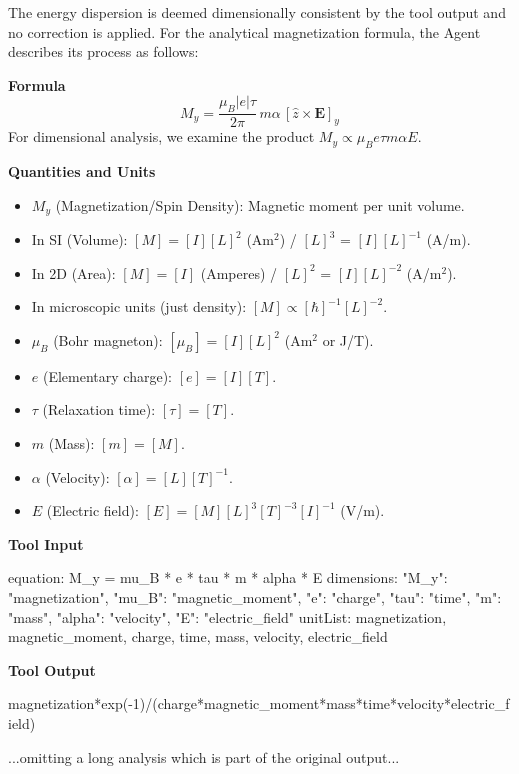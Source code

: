 \documentclass[
	fontsize = 11pt,
	paper = a4,
	draft = false,
	twoside = true,
	titlepage = false
]{scrartcl}
\numberwithin{equation}{subsection}
\begin{document}
	The energy dispersion is deemed dimensionally consistent by the tool output and no correction is applied. For the analytical magnetization formula, the \gls{Agent} describes its process as follows:
	\begin{tcolorbox}[enhanced, breakable, title=Unit Correction for the HDR Magnetization as Stated in the Output, colback=blue!5!white, colframe=blue!75!black] \label{pma:unitHDR}
		\textbf{\large Formula}
		$$
		M_y = \frac{\mu_B |e|\tau}{2\pi}\,m\alpha\,[\hat{z}\times\mathbf{E}]_y
		$$
		For dimensional analysis, we examine the product $M_y \propto \mu_B e \tau m \alpha E$.
		
		\textbf{\large Quantities and Units}
		\begin{itemize}
			\item[-] $M_y$ (Magnetization/Spin Density): Magnetic moment per unit volume.
			\item[-] In SI (Volume): $[M] = [I][L]^2$ (Am$^2$) / $[L]^3$ = $[I][L]^{-1}$ (A/m).
			\item[-] In 2D (Area): $[M] = [I]$ (Amperes) / $[L]^2$ = $[I][L]^{-2}$ (A/m$^2$).
			\item[-] In microscopic units (just density): $[M] \propto [\hbar]^{-1}[L]^{-2}$.
			\item[-] $\mu_B$ (Bohr magneton): $[\mu_B] = [I][L]^2$ (Am$^2$ or J/T).
			\item[-] $e$ (Elementary charge): $[e] = [I][T]$.
			\item[-] $\tau$ (Relaxation time): $[\tau] = [T]$.
			\item[-] $m$ (Mass): $[m] = [M]$.
			\item[-] $\alpha$ (Velocity): $[\alpha] = [L][T]^{-1}$.
			\item[-] $E$ (Electric field): $[E] = [M][L]^3[T]^{-3}[I]^{-1}$ (V/m).
		\end{itemize}
		
		\textbf{\large Tool Input}
		\begin{tcolorbox}[colback=gray!10!white]
			equation: M\_y = mu\_B * e * tau * m * alpha * E\newline
			dimensions: {"M\_y": "magnetization", "mu\_B": "magnetic\_moment", "e": "charge", "tau": "time", "m": "mass", "alpha": "velocity", "E": "electric\_field"}\newline
			unitList: magnetization, magnetic\_moment, charge, time, mass, velocity, electric\_field
		\end{tcolorbox}
		
		\textbf{\large Tool Output}
		\begin{tcolorbox}[colback=gray!10!white]
			magnetization*exp(-1)/(charge*magnetic\_moment*mass*time*velocity*electric\_field)
		\end{tcolorbox}
		...omitting a long analysis which is part of the original output...\\
		

\end{tcolorbox}
\end{document}
